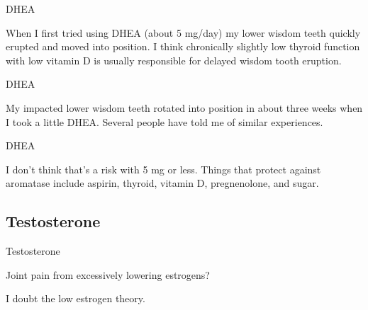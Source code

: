 \documentclass[11pt,oneside,openany,extrafontsizes]{memoir}
\begin{document}
\begin{standalonequote}{DHEA}

    \begin{answer}
      When I first tried using DHEA (about 5 mg/day) my lower wisdom teeth quickly erupted and moved into position. I think chronically slightly low thyroid function with low vitamin D is usually responsible for delayed wisdom tooth eruption.
    \end{answer}
\end{standalonequote}

\begin{standalonequote}{DHEA}

    \begin{answer}
      My impacted lower wisdom teeth rotated into position in about three weeks when I took a little DHEA. Several people have told me of similar experiences.
    \end{answer}
\end{standalonequote}

\begin{standalonequote}{DHEA}

    \begin{answer}
      I don't think that's a risk with 5 mg or less. Things that protect against aromatase include aspirin, thyroid, vitamin D, pregnenolone, and sugar.
    \end{answer}
\end{standalonequote}

\subsection{Testosterone}

\begin{qaexchange}{Testosterone}

    \begin{question}
        Joint pain from excessively lowering estrogens?
    \end{question}

    \begin{answer}
        I doubt the low estrogen theory.
    \end{answer}
\end{qaexchange}
\end{document}
